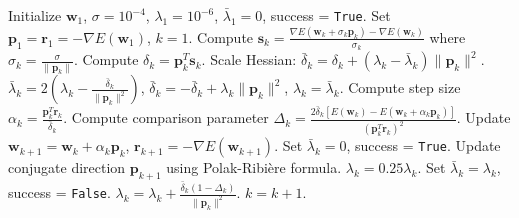 \documentclass[10pt, conference]{IEEEtran}
\begin{document}
\begin{algorithm}[t]
\caption{Scaled Conjugate Gradient (Møller 1993)}
\begin{algorithmic}[1]
\STATE Initialize $\mathbf{w}_1$, $\sigma = 10^{-4}$, $\lambda_1 = 10^{-6}$, $\bar{\lambda}_1 = 0$, success = \texttt{True}.
\STATE Set $\mathbf{p}_1 = \mathbf{r}_1 = -\nabla E(\mathbf{w}_1)$, $k = 1$.
        \STATE Compute $\mathbf{s}_k = \frac{\nabla E(\mathbf{w}_k + \sigma_k \mathbf{p}_k) - \nabla E(\mathbf{w}_k)}{\sigma_k}$ where $\sigma_k = \frac{\sigma}{\|\mathbf{p}_k\|}$.
        \STATE Compute $\delta_k = \mathbf{p}_k^T \mathbf{s}_k$.
    \ENDIF
    \STATE Scale Hessian: $\bar{\delta}_k = \delta_k + (\lambda_k - \bar{\lambda}_k) \|\mathbf{p}_k\|^2$.
        \STATE $\bar{\lambda}_k = 2(\lambda_k - \frac{\bar{\delta}_k}{\|\mathbf{p}_k\|^2})$, $\bar{\delta}_k = -\bar{\delta}_k + \lambda_k \|\mathbf{p}_k\|^2$, $\lambda_k = \bar{\lambda}_k$.
    \ENDIF
    \STATE Compute step size $\alpha_k = \frac{\mathbf{p}_k^T \mathbf{r}_k}{\bar{\delta}_k}$.
    \STATE Compute comparison parameter $\Delta_k = \frac{2 \bar{\delta}_k [E(\mathbf{w}_k) - E(\mathbf{w}_k + \alpha_k \mathbf{p}_k)]}{(\mathbf{p}_k^T \mathbf{r}_k)^2}$.
        \STATE Update $\mathbf{w}_{k+1} = \mathbf{w}_k + \alpha_k \mathbf{p}_k$, $\mathbf{r}_{k+1} = -\nabla E(\mathbf{w}_{k+1})$.
        \STATE Set $\bar{\lambda}_k = 0$, success = \texttt{True}.
        \STATE Update conjugate direction $\mathbf{p}_{k+1}$ using Polak-Ribière formula.
            \STATE $\lambda_k = 0.25 \lambda_k$.
        \ENDIF
    \ELSE
        \STATE Set $\bar{\lambda}_k = \lambda_k$, success = \texttt{False}.
    \ENDIF
        \STATE $\lambda_k = \lambda_k + \frac{\bar{\delta}_k(1 - \Delta_k)}{\|\mathbf{p}_k\|^2}$.
    \ENDIF
    \STATE $k = k + 1$.
\ENDWHILE
\end{algorithmic}
\end{algorithm}
\end{document}
